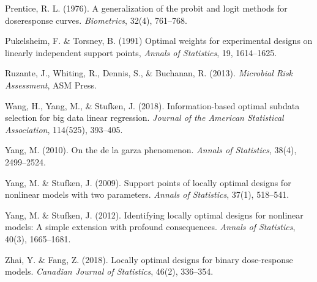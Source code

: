\documentclass[12pt]{TD-CJS}
\begin{document}
\begin{thebibliography}{}
Prentice, R. L. (1976). A generalization of the probit and logit  methods for doseresponse curves. {\it Biometrics}, 32(4), 761–768.

Pukelsheim, F. \& Torsney, B. (1991) Optimal weights for experimental designs on linearly independent support points, {\it Annals of Statistics}, 19, 1614--1625.



Ruzante, J., Whiting, R., Dennis, S., \& Buchanan, R. (2013). {\it Microbial Risk Assessment}, ASM Press.

Wang, H., Yang, M., \& Stufken, J. (2018). Information-based optimal subdata selection for big data linear regression. {\it Journal of the American Statistical Association}, 114(525), 393--405.

Yang, M. (2010). On the de la garza phenomenon. {\it Annals of Statistics}, 38(4), 2499--2524.

Yang, M. \& Stufken, J. (2009). Support points of locally optimal designs for nonlinear models with two parameters. {\it Annals of Statistics}, 37(1), 518--541.

Yang, M. \& Stufken, J. (2012). Identifying locally optimal designs for nonlinear models: A simple extension with profound consequences. {\it Annals of Statistics}, 40(3), 1665--1681.

Zhai, Y. \& Fang, Z. (2018). Locally optimal designs for binary dose-response models. {\it Canadian Journal of Statistics}, 46(2), 336--354.












\end{thebibliography}






\CJShistory
\end{document}
